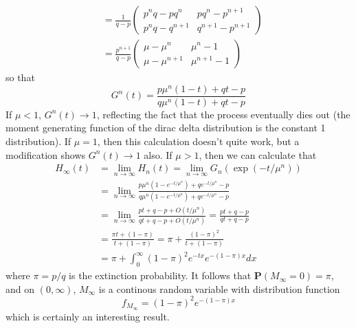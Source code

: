 \begin{example}
\begin{align*}
        &= \frac{1}{q - p} \begin{pmatrix} p^nq - pq^n & pq^n -p^{n+1} \\ p^nq - q^{n+1} & q^{n+1} - p^{n+1} \end{pmatrix}\\
        &= \frac{p^{n+1}}{q - p} \begin{pmatrix} \mu - \mu^n & \mu^n - 1 \\ \mu - \mu^{n+1} & \mu^{n+1} - 1 \end{pmatrix}
    \end{align*}
    so that
    \[ G^n(t) = \frac{p\mu^n(1 - t) + qt - p}{q \mu^n(1 - t) + qt - p} \]
    If $\mu < 1$, $G^n(t) \to 1$, reflecting the fact that the process eventually dies out (the moment generating function of the dirac delta distribution is the constant 1 distribution). If $\mu = 1$, then this calculation doesn't quite work, but a modification shows $G^n(t) \to 1$ also. If $\mu > 1$, then we can calculate that
    \begin{align*}
        H_\infty(t) &= \lim_{n \to \infty} H_n(t) = \lim_{n \to \infty} G_n(\exp(-t/\mu^n))\\
        &= \lim_{n \to \infty} \frac{p\mu^n(1 - e^{-t/\mu^n}) + qe^{-t/\mu^n} - p}{q\mu^n(1 - e^{-t/\mu^n}) + qe^{-t/\mu^n} - p}\\
        &= \lim_{n \to \infty} \frac{pt + q - p + O(t/\mu^{n})}{qt + q - p + O(t/\mu^{n})} = \frac{pt + q - p}{qt + q - p}\\
        &= \frac{\pi t + (1 - \pi)}{t + (1 - \pi)} = \pi + \frac{(1 - \pi)^2}{t + (1 - \pi)}\\
        &= \pi + \int_0^\infty (1 - \pi)^2 e^{-tx}e^{-(1 - \pi)x} dx
    \end{align*}
    where $\pi = p/q$ is the extinction probability. It follows that $\mathbf{P}(M_\infty = 0) = \pi$, and on $(0,\infty)$, $M_\infty$ is a continous random variable with distribution function
    \[ f_{M_\infty} = (1 - \pi)^2 e^{-(1 - \pi)x} \]
    which is certainly an interesting result.


\end{example}
